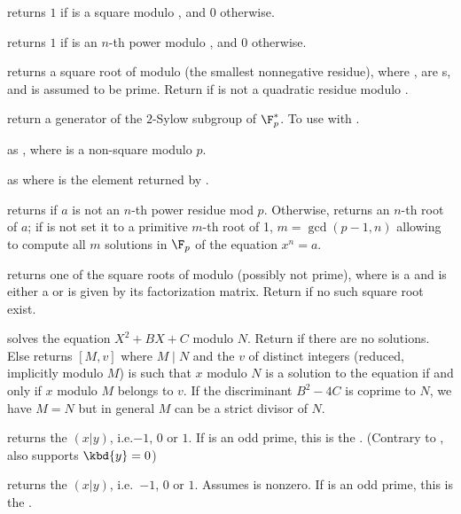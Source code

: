  returns $1$ if  is a square
modulo , and $0$ otherwise.

 returns $1$ if  is an
$n$-th power modulo , and $0$ otherwise.

 returns a square root of  modulo
 (the smallest nonnegative residue), where ,  are
s, and  is assumed to be prime. Return 
if  is not a quadratic residue modulo .

 return a generator of
the $2$-Sylow subgroup of $\F_p^*$. To use with .

 as , where  is a
non-square modulo $p$.

as  where  is the element returned by
.

returns  if $a$ is not an $n$-th power residue mod $p$.
Otherwise, returns an $n$-th root of $a$; if  is not 
set it to a primitive $m$-th root of 1, $m = \gcd(p-1,n)$ allowing to compute
all $m$ solutions in $\F_p$ of the equation $x^n = a$.

 returns one of the square roots of 
modulo  (possibly not prime), where  is a  and 
is either a  or is given by its factorization matrix.  Return
 if no such square root exist.

 solves the equation $X^2 + B X
+ C$ modulo $N$. Return  if there are no solutions. Else returns
 $[M, v]$ where $M \mid N$ and the  $v$ of distinct integers
(reduced, implicitly modulo $M$) is such that $x$ modulo $N$ is a solution to
the equation if and only if $x$ modulo $M$ belongs to $v$. If the
discriminant $B^2-4C$ is coprime to $N$, we have $M = N$ but in general $M$
can be a strict divisor of $N$.

 returns the  $(x|y)$,
i.e.$-1$, $0$ or $1$. If  is an odd prime, this is the . (Contrary to ,  also supports $\kbd{y} = 0$)

 returns the 
$(x|y)$, i.e.~$-1$, $0$ or $1$. Assumes  is nonzero. If  is an
odd prime, this is the .


